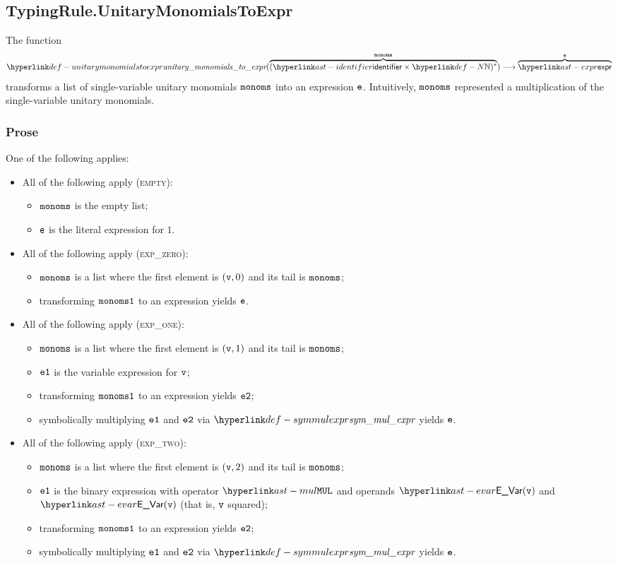 \subsection{TypingRule.UnitaryMonomialsToExpr \label{sec:TypingRule.UnitaryMonomialsToExpr}}
\hypertarget{def-unitarymonomialstoexpr}{}
The function
\[
\unitarymonomialstoexpr(\overname{(\identifier\times\N)^*}{\monoms}) \aslto \overname{\expr}{\ve}
\]
transforms a list of single-variable unitary monomials $\texttt{monoms}$ into an expression $\texttt{e}$.
Intuitively, $\texttt{monoms}$ represented a multiplication of the single-variable unitary monomials.

\subsubsection{Prose}
One of the following applies:
\begin{itemize}
  \item All of the following apply (\textsc{empty}):
  \begin{itemize}
    \item $\texttt{monoms}$ is the empty list;
    \item $\texttt{e}$ is the literal expression for $1$.
  \end{itemize}

  \item All of the following apply (\textsc{exp\_zero}):
  \begin{itemize}
    \item $\texttt{monoms}$ is a list where the first element is $(\texttt{v}, 0)$ and its tail is $\texttt{monoms}$;
    \item transforming $\texttt{monoms1}$ to an expression yields $\texttt{e}$.
  \end{itemize}

  \item All of the following apply (\textsc{exp\_one}):
  \begin{itemize}
    \item $\texttt{monoms}$ is a list where the first element is $(\texttt{v}, 1)$ and its tail is $\texttt{monoms}$;
    \item $\texttt{e1}$ is the variable expression for $\texttt{v}$;
    \item transforming $\texttt{monoms1}$ to an expression yields $\texttt{e2}$;
    \item symbolically multiplying $\texttt{e1}$ and $\texttt{e2}$ via $\symmulexpr$ yields $\texttt{e}$.
  \end{itemize}

  \item All of the following apply (\textsc{exp\_two}):
  \begin{itemize}
    \item $\texttt{monoms}$ is a list where the first element is $(\texttt{v}, 2)$ and its tail is $\texttt{monoms}$;
    \item $\texttt{e1}$ is the binary expression with operator $\MUL$ and operands $\EVar(\vv)$ and $\EVar(\vv)$
          (that is, $\texttt{v}$ squared);
    \item transforming $\texttt{monoms1}$ to an expression yields $\texttt{e2}$;
    \item symbolically multiplying $\texttt{e1}$ and $\texttt{e2}$ via $\symmulexpr$ yields $\texttt{e}$.
  \end{itemize}


\end{itemize}
